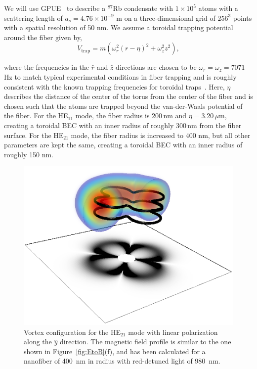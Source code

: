 We will use GPUE~\cite{schloss2018} to describe a $^{87}$Rb condensate with $1\times10^5$ atoms with a scattering length of $a_s=4.76 \times 10^{-9}$ m on a three-dimensional grid of $256^3$ points with a spatial resolution of 50 nm.
We assume a toroidal trapping potential around the fiber given by,
\begin{equation}
V_\text{trap} = m(\omega_r^2(r-\eta)^2 + \omega_z^2z^2),
\label{eqn:potential}
\end{equation}

\noindent where the frequencies in the $\hat r$ and $\hat z$ directions are chosen to be $\omega_r = \omega_z = 7071$Hz to match typical experimental conditions in fiber trapping \cite{vetsch2010} and is roughly consistent with the known trapping frequencies for toroidal traps~\cite{kumar2016, schnelle2008}.
Here, $\eta$ describes the distance of the center of the torus from the center of the fiber and is chosen such that the atoms are trapped beyond the van-der-Waals potential of the fiber.
For the HE$_{11}$ mode, the fiber radius is 200\,nm and $\eta = 3.20$\,$\mu$m, creating a toroidal BEC with an inner radius of roughly 300\,nm from the fiber surface.
For the HE$_{21}$ mode, the fiber radius is increased to 400 nm, but all other parameters are kept the same, creating a toroidal BEC with an inner radius of roughly 150 nm.

\begin{figure}[tb]
\center \includegraphics[width=0.5\linewidth]{data/3d/HE21_3d.png}
 
 \caption{Vortex configuration for the HE$_{21}$ mode with linear polarization along the $\hat y$ direction.
\label{eqn:potential}
The magnetic field profile is similar to the one shown in Figure~\ref{fig:EtoB}(f), and has been calculated for a nanofiber of 400~nm in radius with red-detuned light of 980~nm.}
 \label{fig:HE21_3d}
\end{figure}

